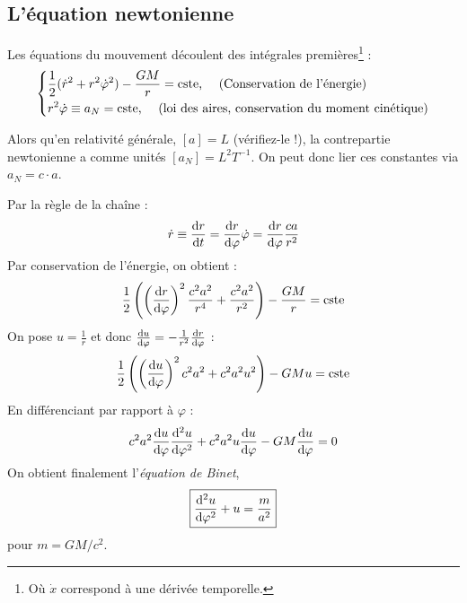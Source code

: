 \subsection{L'équation newtonienne}
Les équations du mouvement découlent des intégrales premières\footnote{Où $\dot{x}$ correspond à une dérivée temporelle.} : 
\begin{align}
    \begin{dcases}
        \frac{1}{2} (\dot{r}^2 + r^2 \dot{\varphi}^2 ) - \frac{GM}{r} = \text{cste, \quad (Conservation de l'énergie)} \\
        r^2 \dot{\varphi} \equiv a_N = \text{cste, \quad (loi des aires, conservation du moment cinétique)}
    \end{dcases}
\end{align}
\begin{rmk}
    Alors qu'en relativité générale, $[a] = L$ (vérifiez-le !), la contrepartie newtonienne a comme unités $[a_N] = L^2 T^{-1}$. On peut donc lier ces constantes via $a_N = c\cdot a$.
\end{rmk}
Par la règle de la chaîne :
\begin{equation}
    \dot{r} \equiv \frac{\mathrm{d} r}{ \mathrm{d} t} = \frac{\mathrm{d} r}{\mathrm{d} \varphi} \dot{\varphi} = \frac{\mathrm{d} r}{\mathrm{d} \varphi} \frac{c a}{r^2}
\end{equation}
Par conservation de l'énergie, on obtient :
\begin{equation}
    \frac{1}{2} \left( \left( \frac{\mathrm{d} r}{\mathrm{d} \varphi}\right)^2 \frac{c^2a^2}{r^4} + \frac{c^2a^2}{r^2} \right) - \frac{GM}{r} = \text{cste} 
\end{equation}
On pose $u = \frac{1}{r}$ et donc $\frac{\mathrm{d} u}{\mathrm{d} \varphi} = - \frac{1}{r^2} \frac{\mathrm{d} r}{\mathrm{d} \varphi}$ :
\begin{equation}
    \frac{1}{2} \left( \left( \frac{\mathrm{d} u}{\mathrm{d} \varphi}\right)^2 c^2 a^2 + c^2a^2 u^2 \right) - GM u = \text{cste} 
\end{equation}
En différenciant par rapport à $\varphi$ :
\begin{equation}
    c^2 a^2 \frac{\mathrm{d} u}{\mathrm{d} \varphi} \frac{\mathrm{d}^2 u}{\mathrm{d} \varphi^2} + c^2 a^2 u \frac{\mathrm{d} u}{\mathrm{d} \varphi} - GM \frac{\mathrm{d} u}{\mathrm{d} \varphi}  =0
\end{equation}
On obtient finalement l'\emph{équation de Binet},
\begin{align}
    \label{équation de Binet}
    \boxed{\frac{\mathrm{d}^2u}{\mathrm{d} \varphi^2} + u = \frac{m}{a^2}}
\end{align}
pour $m = GM/c^2$.
